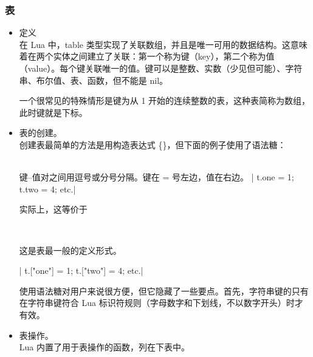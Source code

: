 \subsubsection{表}

\begin{itemize}

\item 定义\\
在 Lua 中，table 类型实现了关联数组，并且是唯一可用的数据结构。这意味着在两个实体之间建立了关联：第一个称为键（key），第二个称为值（value）。每个键关联唯一的值。键可以是整数、实数（少见但可能）、字符串、布尔值、表、函数，但不能是 nil。

  一个很常见的特殊情形是键为从 1 开始的连续整数的表，这种表简称为数组，此时键就是下标。


  \item 表的创建。\\
  创建表最简单的方法是用构造表达式 \{\}，但下面的例子使用了语法糖：

  \begin{mybox}
     \\
    键–值对之间用逗号或分号分隔。键在 = 号左边，值在右边。
   | t.one = 1; t.two = 4; etc.|
  \end{mybox}

  实际上，这等价于

  \begin{mybox}
     \\
  \end{mybox}

  这是表最一般的定义形式。

   | t.["one"] = 1; t.["two"] = 4; etc.|

  使用语法糖对用户来说很方便，但它隐藏了一些要点。首先，字符串键的只有在字符串键符合 Lua 标识符规则（字母数字和下划线，不以数字开头）时才有效。

  \item 表操作。\\
Lua 内置了用于表操作的函数，列在下表中。


\end{itemize}
